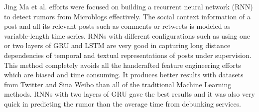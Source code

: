 \documentclass[a4paper, 11pt]{article}
\begin{document}


Jing Ma et al. efforts were focused on building a recurrent neural network (RNN) to detect rumors from Microblogs effectively. The social context information of a post and all its relevant posts such as comments or retweets is modeled as variable-length time series.  RNNs with different configurations such as using one or two layers of GRU and LSTM are very good in capturing long distance dependencies of temporal and textual representations of posts under supervision. This method completely avoids all the handcrafted feature engineering efforts which are biased and time consuming. It produces better results with datasets from Twitter and Sina Weibo than all of the traditional Machine Learning methods. RNNs with two layers of GRU gave the best results and it was also very quick in predicting the rumor than the average time from debunking services.  




\end{document}
